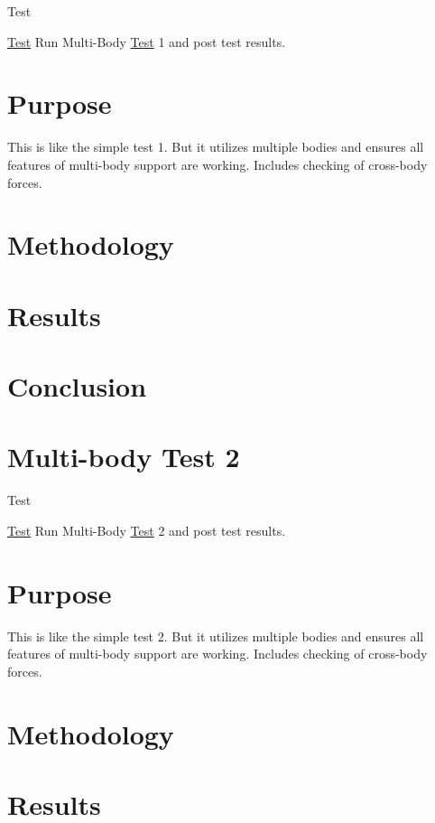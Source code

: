 \begin{DoxyRefDesc}{Test}
\item[\hyperlink{test__test000010}{Test}]Run Multi-\/\-Body \hyperlink{class_test}{Test} 1 and post test results.\end{DoxyRefDesc}


\section*{Purpose}

This is like the simple test 1. But it utilizes multiple bodies and ensures all features of multi-\/body support are working. Includes checking of cross-\/body forces.

\section*{Methodology}

\section*{Results}

\section*{Conclusion}\hypertarget{MultiBodyTest2}{}\section{Multi-\/body Test 2}\label{MultiBodyTest2}
\begin{DoxyRefDesc}{Test}
\item[\hyperlink{test__test000002}{Test}]Run Multi-\/\-Body \hyperlink{class_test}{Test} 2 and post test results.\end{DoxyRefDesc}


\section*{Purpose}

This is like the simple test 2. But it utilizes multiple bodies and ensures all features of multi-\/body support are working. Includes checking of cross-\/body forces.

\section*{Methodology}

\section*{Results}

